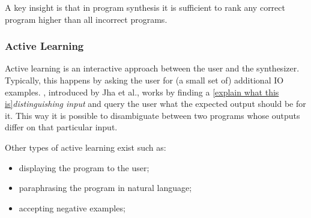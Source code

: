  A key insight is that in program synthesis it
is sufficient to rank any correct program higher than all incorrect programs.

\subsubsection{Active Learning}

Active learning is an interactive approach between the user and the synthesizer.
Typically, this happens by asking the user for (a small set of) additional
\ac{IO} examples. ,
introduced by Jha et al.\cite{Jha:oracle:2010}, works by finding a \ref{explain
what this is}\textit{distinguishing input} and query the user what the expected
output should be for it. This way it is possible to disambiguate between two
programs whose outputs differ on that particular input.

Other types of active learning exist such as:
\begin{itemize}
\item displaying the program to the user;
\item paraphrasing the program in natural language;
\item accepting negative examples; 
\end{itemize}



